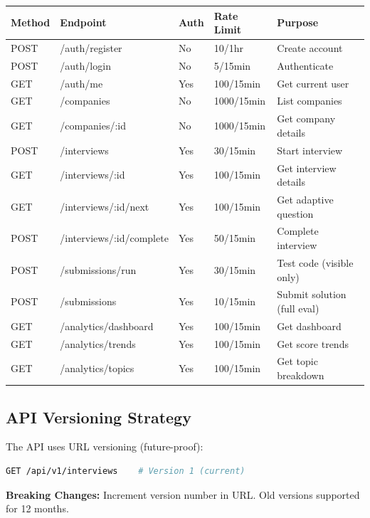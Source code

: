 \documentclass[12pt,a4paper,oneside]{article}
\begin{document}
\begin{table}[H]
\centering
\small
\begin{tabular}{|p{1.5cm}|p{3.5cm}|p{1.5cm}|p{2.5cm}|p{2.8cm}|}
\hline
\textbf{Method} & \textbf{Endpoint} & \textbf{Auth} & \textbf{Rate Limit} & \textbf{Purpose} \\
\hline
POST & /auth/register & No & 10/1hr & Create account \\
\hline
POST & /auth/login & No & 5/15min & Authenticate \\
\hline
GET & /auth/me & Yes & 100/15min & Get current user \\
\hline
GET & /companies & No & 1000/15min & List companies \\
\hline
GET & /companies/:id & No & 1000/15min & Get company details \\
\hline
POST & /interviews & Yes & 30/15min & Start interview \\
\hline
GET & /interviews/:id & Yes & 100/15min & Get interview details \\
\hline
GET & /interviews/:id/next & Yes & 100/15min & Get adaptive question \\
\hline
POST & /interviews/:id/complete & Yes & 50/15min & Complete interview \\
\hline
POST & /submissions/run & Yes & 30/15min & Test code (visible only) \\
\hline
POST & /submissions & Yes & 10/15min & Submit solution (full eval) \\
\hline
GET & /analytics/dashboard & Yes & 100/15min & Get dashboard \\
\hline
GET & /analytics/trends & Yes & 100/15min & Get score trends \\
\hline
GET & /analytics/topics & Yes & 100/15min & Get topic breakdown \\
\hline
\end{tabular}
\end{table}

\subsection{API Versioning Strategy}

The API uses URL versioning (future-proof):

\begin{lstlisting}[language=bash, caption=Current API Version]
GET /api/v1/interviews    # Version 1 (current)
\end{lstlisting}

\textbf{Breaking Changes:} Increment version number in URL. Old versions supported for 12 months.
\end{document}

